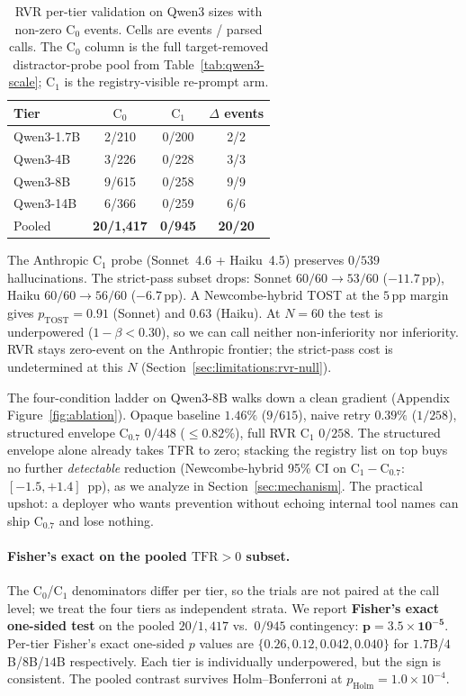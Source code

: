 \begin{table}[t]
\caption{RVR per-tier validation on Qwen3 sizes with non-zero $\mathrm{C}_0$
events. Cells are events / parsed calls. The $\mathrm{C}_0$ column is the
full target-removed distractor-probe pool from Table~\ref{tab:qwen3-scale};
$\mathrm{C}_1$ is the registry-visible re-prompt arm.}
\label{tab:rvr-validation}
\centering
\small
\setlength{\tabcolsep}{8pt}
\begin{tabular}{lccc}
\toprule
Tier & $\mathrm{C}_0$ & $\mathrm{C}_1$ & $\Delta$ events \\
\midrule
Qwen3-1.7B & 2/210 & 0/200 & 2/2 \\
Qwen3-4B   & 3/226 & 0/228 & 3/3 \\
Qwen3-8B   & 9/615 & 0/258 & 9/9 \\
Qwen3-14B  & 6/366 & 0/259 & 6/6 \\
\midrule
Pooled     & \textbf{20/1{,}417} & \textbf{0/945} & \textbf{20/20} \\
\bottomrule
\end{tabular}
\end{table}

The Anthropic $\mathrm{C}_1$ probe (Sonnet~4.6 + Haiku~4.5)
preserves $0/539$ hallucinations. The strict-pass subset drops:
Sonnet $60/60\!\to\!53/60$ ($-11.7\,$pp), Haiku $60/60\!\to\!56/60$
($-6.7\,$pp). A Newcombe-hybrid TOST at the $5\,$pp margin gives
$p_{\mathrm{TOST}}\!=\!0.91$ (Sonnet) and $0.63$ (Haiku). At $N=60$
the test is underpowered ($1\!-\!\beta\!<\!0.30$), so we can call
neither non-inferiority nor inferiority. RVR stays zero-event on the
Anthropic frontier; the strict-pass cost is undetermined at this
$N$ (Section~\ref{sec:limitations:rvr-null}).

The four-condition ladder on Qwen3-8B walks down a clean gradient
(Appendix Figure~\ref{fig:ablation}). Opaque baseline $1.46\%$ ($9/615$), naive
retry $0.39\%$ ($1/258$), structured envelope $\mathrm{C}_{0.7}$ $0/448$
($\leq\!0.82\%$), full RVR $\mathrm{C}_1$ $0/258$. The structured
envelope alone already takes TFR to zero; stacking the registry list on
top buys no further \emph{detectable} reduction (Newcombe-hybrid 95\% CI on
$\mathrm{C}_1\!-\!\mathrm{C}_{0.7}$: $[-1.5, +1.4]$~pp), as we analyze in
Section~\ref{sec:mechanism}. The practical upshot: a deployer who wants
prevention without echoing internal tool names can ship
$\mathrm{C}_{0.7}$ and lose nothing.

\paragraph{Fisher's exact on the pooled $\mathrm{TFR}\!>\!0$
subset.} The $\mathrm{C}_0$/$\mathrm{C}_1$ denominators differ per
tier, so the trials are not paired at the call level; we treat the
four tiers as independent strata. We report \textbf{Fisher's exact
one-sided test} on the pooled $20/1{,}417$ vs.\ $0/945$ contingency:
$\mathbf{p = 3.5\!\times\!10^{-5}}$. Per-tier Fisher's exact
one-sided $p$ values are $\{0.26, 0.12, 0.042, 0.040\}$ for
$1.7$B/$4$B/$8$B/$14$B respectively. Each tier is individually
underpowered, but the sign is consistent. The pooled contrast
survives Holm--Bonferroni at
$p_{\mathrm{Holm}}\!=\!1.0\!\times\!10^{-4}$.

